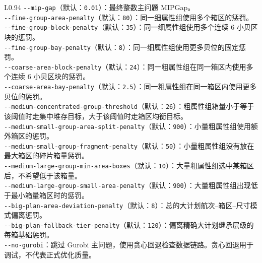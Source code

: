 \documentclass[UTF8,a4paper,11pt]{ctexart}
\newcommand{\code}[1]{\nolinkurl{#1}}
\begin{document}
\begin{longtable}{L{0.94\linewidth}}
\code{--mip-gap}（默认：\code{0.01}）：最终整数主问题 MIPGap。\\[0.25em]
\code{--fine-group-area-penalty}（默认：\code{80}）：同一细属性组使用多个箱区的惩罚。\\[0.25em]
\code{--fine-group-block-penalty}（默认：\code{35}）：同一细属性组使用多个连续 6 小贝区块的惩罚。\\[0.25em]
\code{--fine-group-bay-penalty}（默认：\code{8}）：同一细属性组使用更多贝位的固定惩罚。\\[0.25em]
\code{--coarse-area-block-penalty}（默认：\code{24}）：同一粗属性组在同一箱区内使用多个连续 6 小贝区块的惩罚。\\[0.25em]
\code{--coarse-area-bay-penalty}（默认：\code{2.5}）：同一粗属性组在同一箱区内使用更多贝位的惩罚。\\[0.25em]
\code{--medium-concentrated-group-threshold}（默认：\code{26}）：粗属性组箱量小于等于该阈值时走集中堆存目标，大于该阈值时走箱区均衡目标。\\[0.25em]
\code{--medium-small-group-area-split-penalty}（默认：\code{900}）：小量粗属性组使用额外箱区的惩罚。\\[0.25em]
\code{--medium-small-group-fragment-penalty}（默认：\code{50}）：小量粗属性组没有放在最大箱区的碎片箱量惩罚。\\[0.25em]
\code{--medium-large-group-min-area-boxes}（默认：\code{10}）：大量粗属性组选中某箱区后，不希望低于该箱量。\\[0.25em]
\code{--medium-large-group-small-area-penalty}（默认：\code{900}）：大量粗属性组出现低于最小箱量箱区时的惩罚。\\[0.25em]
\code{--big-plan-area-deviation-penalty}（默认：\code{8}）：总的大计划航次--箱区--尺寸模式偏离惩罚。\\[0.25em]
\code{--big-plan-fallback-tier-penalty}（默认：\code{120}）：偏离精确大计划继承层级的每箱基础惩罚。\\[0.25em]
\code{--no-gurobi}：跳过 Gurobi 主问题，使用贪心回退检查数据链路。贪心回退用于调试，不代表正式优化质量。\\
\bottomrule
\end{longtable}
\end{document}
